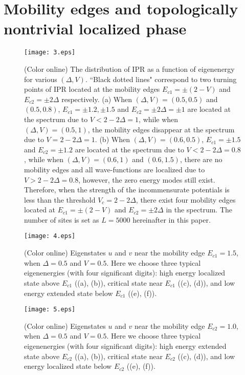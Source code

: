 \documentclass[prb,showpacs,twocolumn,aps,superscriptaddress,a4paper]{revtex4-1}
\begin{document}
\section{Mobility edges and topologically nontrivial localized phase}
\label{n3}
\begin{figure}
  \centering
  \texttt{[image: 3.eps]}\\
  \caption{(Color online) The distribution of IPR as a function of eigenenergy for various
	$(\Delta,V)$. ``Black dotted lines" correspond to two turning points of IPR located at the mobility edges $E_{c1}=\pm (2- V)$ and $E_{c2}=\pm 2\Delta$ respectively. (a) When $(\Delta,V)= (0.5,0.5)$ and $(0.5,0.8)$, $E_{c1}=\pm 1.2, \pm 1.5 $ and $E_{c2}=\pm 2\Delta=\pm 1$ are located at the spectrum due to $V<2-2\Delta=1$, while when $(\Delta,V)= (0.5,1)$, the mobility edges disappear at the spectrum due to $V=2-2\Delta=1$.
	(b) When $(\Delta,V)= (0.6,0.5)$, $E_{c1}=\pm 1.5$ and $E_{c2}=\pm 1.2$ are located at the spectrum due to $V<2-2\Delta=0.8$, while when $(\Delta,V)= (0.6,1)$ and $(0.6,1.5)$, there are no mobility edges and all wave-functions are localized due to $V>2-2\Delta=0.8$, however, the zero energy modes still exist. Therefore, when the strength of the incommensurate potentials is less than the threshold $V_c = 2 - 2 \Delta$, there exist four mobility edges located at $E_{c1}=\pm (2- V)$ and $E_{c2}=\pm 2\Delta$ in the spectrum. The number of sites is set as $L=5000$ hereinafter in this paper.}
  \label{003}
\end{figure}
\begin{figure}
  \centering
  \texttt{[image: 4.eps]}\\
  \caption{(Color online) Eigenstates $u$ and $v$ near the mobility edge $E_{c1}=1.5$, when $\Delta=0.5$ and $V=0.5$. Here we choose three typical eigenenergies (with four significant digits): high energy localized state above $E_{c1}$ ((a), (b)), critical state near $E_{c1}$ ((c), (d)), and low energy extended state below $E_{c1}$ ((e), (f)).}
  \label{004}
\end{figure}
\begin{figure}
  \centering
  \texttt{[image: 5.eps]}\\
  \caption{(Color online) Eigenstates $u$ and $v$ near the mobility edge $E_{c2}=1.0$, when $\Delta=0.5$ and $V=0.5$. Here we choose three typical eigenenergies (with four significant digits): high energy extended state above $E_{c2}$ ((a), (b)), critical state near $E_{c2}$ ((c), (d)), and low energy localized state below $E_{c2}$ ((e), (f)).}
  \label{005}
\end{figure}
\end{document}
